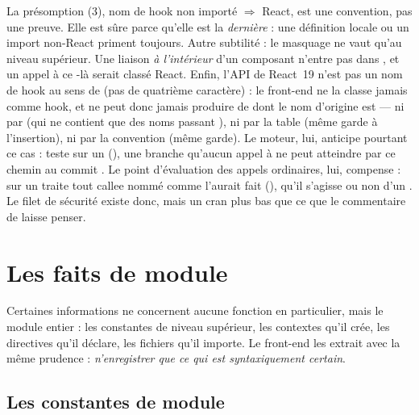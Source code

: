 \begin{piege}
La présomption (3), \og nom de hook non importé $\Rightarrow$ React\fg{}, est une convention, pas une preuve. Elle est sûre parce qu'elle est la \emph{dernière} : une définition locale ou un import non-React priment toujours. Autre subtilité : le masquage ne vaut qu'au niveau supérieur. Une liaison  \emph{à l'intérieur} d'un composant n'entre pas dans , et un appel à ce -là serait classé React. Enfin, l'API  de React~19 n'est pas un nom de hook au sens de  (pas de quatrième caractère) : le front-end ne la classe jamais comme hook, et  ne peut donc jamais produire de  dont le nom d'origine est  --- ni par  (qui ne contient que des noms passant ), ni par la table  (même garde à l'insertion), ni par la convention (même garde). Le moteur, lui, anticipe pourtant ce cas :  teste  sur un  (), une branche qu'aucun appel à  ne peut atteindre par ce chemin au commit \snapshotCommit{}. Le point d'évaluation des appels ordinaires, lui, compense :  sur un  traite tout callee nommé  comme  l'aurait fait (), qu'il s'agisse ou non d'un . Le filet de sécurité existe donc, mais un cran plus bas que ce que le commentaire de  laisse penser.
\end{piege}

\section{Les faits de module}
\label{sec:frontend-faits-module}

Certaines informations ne concernent aucune fonction en particulier, mais le module entier : les constantes de niveau supérieur, les contextes qu'il crée, les directives qu'il déclare, les fichiers qu'il importe. Le front-end les extrait avec la même prudence : \emph{n'enregistrer que ce qui est syntaxiquement certain}.

\subsection{Les constantes de module}

